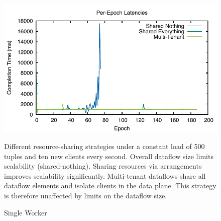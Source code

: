 \documentclass[../catalog.tex]{subfiles}
\begin{document}
\begin{figure}[h!]
  \includegraphics[width=1.0\linewidth]{results/multitenant_w1_p1/times}
  \caption{Single Worker}
  \label{fig:sharing}
  \medskip
  \small

  Different resource-sharing strategies under a constant load of 500
  tuples and ten new clients every second. Overall dataflow size
  limits scalability (shared-nothing). Sharing resources via
  arrangements improves scalability significantly. Multi-tenant
  dataflows share all dataflow elements and isolate clients in the
  data plane. This strategy is therefore unaffected by limits on the
  dataflow size.
\end{figure}
\end{document}
